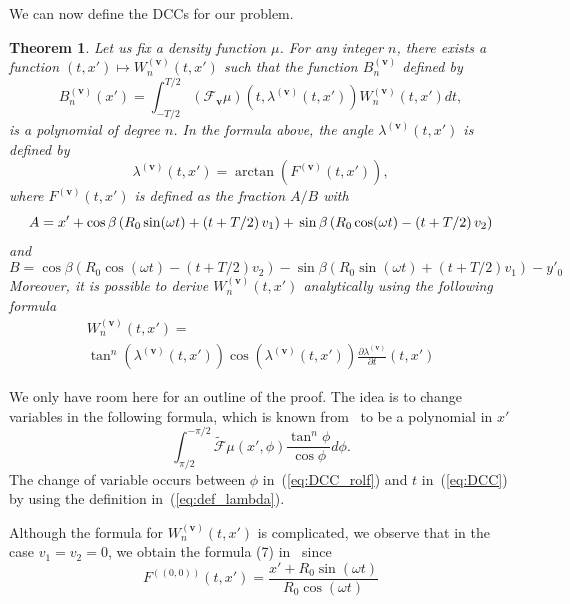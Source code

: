 \documentclass[letterpaper,twocolumn]{IEEEtran}
\newcommand{\bv}{\mathbf{v}}
\newcommand{\Tbv}{\mathcal{F}_{\mathbf{v}}}
\newcommand{\Bnv}{B_n^{(\bv)}}
\newcommand{\Wnv}{W_n^{(\bv)}}
\newtheorem{theorem}{Theorem}
\begin{document}
We can now define the DCCs for our problem.
\begin{theorem}
\label{theo:main}
Let us fix a density function $\mu$. For any integer $n$, there exists a function $(t,x')\mapsto \Wnv(t,x')$ such that the function $\Bnv$ defined by
\begin{equation}
	\Bnv(x') = \int_{-T/2}^{T/2} \left( \Tbv \mu \right)\left( t,\lambda^{(\bv)}(t,x') \right) \Wnv(t,x') dt,
\label{eq:DCC}
\end{equation}
is a polynomial of degree $n$. In the formula above, the angle $\lambda^{(\bv)}(t,x')$ is defined by
\begin{equation}
	\lambda^{(\bv)}(t,x') = \arctan \left( F^{(\bv)}(t,x') \right),
\label{eq:def_lambda}
\end{equation}
where $F^{(\bv)}(t,x')$ is defined as the fraction $A/B$ with
\begin{dmath}
	A = x' + \cos \beta \left( R_0 \sin(\omega t) + \left( t + T/2 \right)v_1 \right) + \\
	\sin \beta \left( R_0 \cos(\omega t) - \left( t + T/2 \right)v_2 \right)
\end{dmath}
and
\begin{dmath}
	B = \cos \beta \left( R_0 \cos(\omega t) - \left( t + T/2 \right)v_2 \right) - \sin \beta \left( R_0 \sin(\omega t) + \left( t + T/2 \right)v_1 \right) - y'_0 
\end{dmath}
Moreover, it is possible to derive $\Wnv(t,x')$ analytically using the following formula
\begin{multline}
	\Wnv(t,x') = \\
	\tan^n \left( \lambda^{(\bv)}(t,x') \right) \cos \left( \lambda^{(\bv)}(t,x') \right) \frac{\partial \lambda^{(\bv)}}{\partial t} (t,x')
\end{multline}
\end{theorem}

We only have room here for an outline of the proof. The idea is to change variables in the following formula, which is known from~\cite{clackdoyle2013necessary} to be a polynomial in $x'$
\begin{equation}
	\int_{\pi/2}^{-\pi/2} \tilde{\mathcal{F}}\mu (x',\phi) \frac{\tan^n \phi}{\cos \phi} d\phi.
\label{eq:DCC_rolf}
\end{equation}
The change of variable occurs between $\phi$ in~(\ref{eq:DCC_rolf}) and $t$ in~(\ref{eq:DCC}) by using the definition in~(\ref{eq:def_lambda}).

Although the formula for $\Wnv(t,x')$ is complicated, we observe that in the case $v_1=v_2=0$, we obtain the formula (7) in~\cite{clackdoyle2015consistency} since
\begin{equation}
	F^{\left( (0,0)\right) }(t,x')= \frac{x' + R_0 \sin(\omega t)}{R_0 \cos(\omega t)}
\end{equation}
\end{document}
